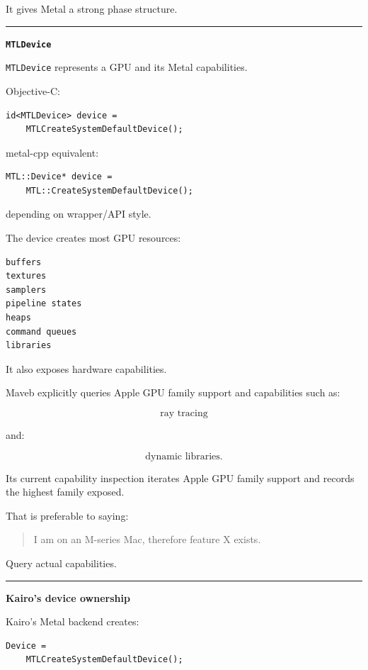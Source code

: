 It gives Metal a strong phase structure.

\begin{center}\rule{0.5\linewidth}{0.5pt}\end{center}

\textbf{\texttt{MTLDevice}}

\texttt{MTLDevice} represents a GPU and its Metal capabilities.

Objective-C:

\begin{verbatim}
id<MTLDevice> device =
    MTLCreateSystemDefaultDevice();
\end{verbatim}

metal-cpp equivalent:

\begin{verbatim}
MTL::Device* device =
    MTL::CreateSystemDefaultDevice();
\end{verbatim}

depending on wrapper/API style.

The device creates most GPU resources:

\begin{verbatim}
buffers
textures
samplers
pipeline states
heaps
command queues
libraries
\end{verbatim}

It also exposes hardware capabilities.

Maveb explicitly queries Apple GPU family support and capabilities such as:

\[
\text{ray tracing}
\]

and:

\[
\text{dynamic libraries}.
\]

Its current capability inspection iterates Apple GPU family support and records the highest family exposed.

That is preferable to saying:

\begin{quote}
I am on an M-series Mac, therefore feature X exists.
\end{quote}

Query actual capabilities.

\begin{center}\rule{0.5\linewidth}{0.5pt}\end{center}

\textbf{Kairo's device ownership}

Kairo's Metal backend creates:

\begin{verbatim}
Device =
    MTLCreateSystemDefaultDevice();
\end{verbatim}

